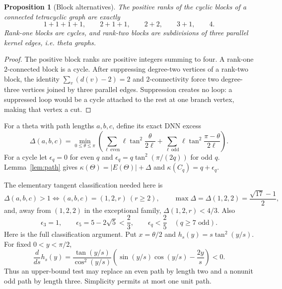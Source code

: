\documentclass[11pt]{article}
\newtheorem{proposition}[theorem]{Proposition}
\theoremstyle{remark}
\newcommand{\kap}{\kappa}
\begin{document}
\begin{proposition}[Block alternatives]\label{prop:block-alternatives}
The positive ranks of the cyclic blocks of a connected tetracyclic graph are
exactly
\[
 1+1+1+1,\qquad2+1+1,\qquad2+2,\qquad3+1,\qquad4.
\]
Rank-one blocks are cycles, and rank-two blocks are subdivisions of three
parallel kernel edges, i.e. theta graphs.
\end{proposition}

\begin{proof}
The positive block ranks are positive integers summing to four.  A rank-one
$2$-connected block is a cycle.  After suppressing degree-two vertices of a
rank-two block, the identity $\sum_v(d(v)-2)=2$ and $2$-connectivity force two
degree-three vertices joined by three parallel edges.  Suppression creates no
loop: a suppressed loop would be a cycle attached to the rest at one branch
vertex, making that vertex a cut.
\end{proof}

For a theta with path lengths $a,b,c$, define its exact DNN excess
\begin{equation}\label{eq:theta-excess}
 \Delta(a,b,c)=\min_{0\leq\theta\leq\pi}
 \left(
 \sum_{\ell\ \mathrm{even}}\ell\tan^2\frac{\theta}{2\ell}
 +\sum_{\ell\ \mathrm{odd}}\ell\tan^2\frac{\pi-\theta}{2\ell}
 \right).
\end{equation}
For a cycle let $\epsilon_q=0$ for even $q$ and
$\epsilon_q=q\tan^2(\pi/(2q))$ for odd $q$.  Lemma~\ref{lem:path} gives
$\kap(\Theta)=|E(\Theta)|+\Delta$ and
$\kap(C_q)=q+\epsilon_q$.

The elementary tangent classification needed here is
\begin{equation}\label{eq:theta-class}
 \Delta(a,b,c)>1
 \Longleftrightarrow (a,b,c)=(1,2,r)\ (r\geq2),
 \qquad
 \max\Delta=\Delta(1,2,2)=\frac{\sqrt{17}-1}{2},
\end{equation}
and, away from $(1,2,2)$ in the exceptional family,
$\Delta(1,2,r)<4/3$.  Also
\begin{equation}\label{eq:cycle-values}
 \epsilon_3=1,
 \qquad \epsilon_5=5-2\sqrt5<\frac23,
 \qquad \epsilon_q<\frac25\quad(q\geq7\text{ odd}).
\end{equation}
Here is the full classification argument.  Put $x=\theta/2$ and
$h_s(y)=s\tan^2(y/s)$.  For fixed $0<y<\pi/2$,
\begin{equation}\label{eq:h-monotone}
 \frac{d}{ds}h_s(y)=
 \frac{\tan(y/s)}{\cos^2(y/s)}
 \left(\sin(y/s)\cos(y/s)-\frac{2y}{s}\right)<0.
\end{equation}
Thus an upper-bound test may replace an even path by length two and a nonunit
odd path by length three.  Simplicity permits at most one unit path.
\end{document}
